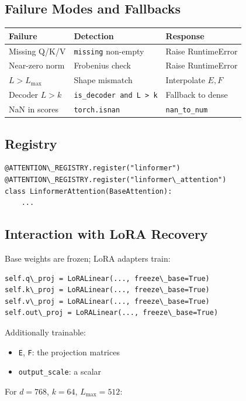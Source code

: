 \subsection{Failure Modes and Fallbacks}

\begin{table}[H]
\centering
\small
\begin{tabular}{lll}
\toprule
\textbf{Failure} & \textbf{Detection} & \textbf{Response} \\
\midrule
Missing Q/K/V & \texttt{missing} non-empty & Raise RuntimeError \\
Near-zero norm & Frobenius check & Raise RuntimeError \\
$L > L_\text{max}$ & Shape mismatch & Interpolate $E, F$ \\
Decoder $L > k$ & \texttt{is\_decoder and L \textgreater{} k} & Fallback to dense \\
NaN in scores & \texttt{torch.isnan} & \texttt{nan\_to\_num} \\
\bottomrule
\end{tabular}
\end{table}

\subsection{Registry}

\begin{lstlisting}
@ATTENTION\_REGISTRY.register("linformer")
@ATTENTION\_REGISTRY.register("linformer\_attention")
class LinformerAttention(BaseAttention):
    ...
\end{lstlisting}

\subsection{Interaction with LoRA Recovery}

Base weights are frozen; LoRA adapters train:

\begin{lstlisting}
self.q\_proj = LoRALinear(..., freeze\_base=True)
self.k\_proj = LoRALinear(..., freeze\_base=True)
self.v\_proj = LoRALinear(..., freeze\_base=True)
self.out\_proj = LoRALinear(..., freeze\_base=True)
\end{lstlisting}

Additionally trainable:
\begin{itemize}
\item \texttt{E}, \texttt{F}: the projection matrices
\item \texttt{output\_scale}: a scalar

\end{itemize}
For $d = 768$, $k = 64$, $L_\text{max} = 512$:

